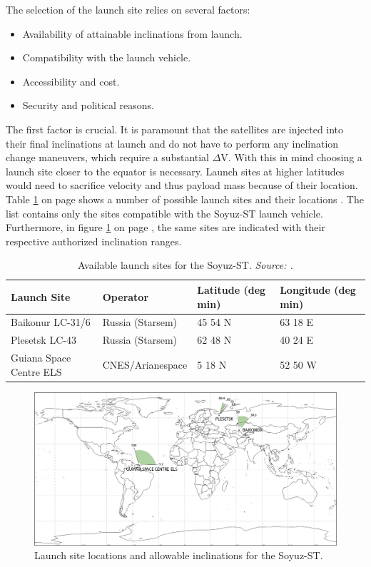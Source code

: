 The selection of the launch site relies on several factors:

\begin{itemize}
	\item Availability of attainable inclinations from launch.
	\item Compatibility with the launch vehicle.
	\item Accessibility and cost.
	\item Security and political reasons. 
\end{itemize}

The first factor is crucial. It is paramount that the satellites are injected into their final inclinations at launch and do not have to perform any inclination change maneuvers, which require a substantial $\Delta$V. With this in mind choosing a launch site closer to the equator is necessary. Launch sites at higher latitudes would need to sacrifice velocity and thus payload mass because of their location. Table \ref{table:launchtable} on page \pageref{table:launchtable} shows a number of possible launch sites and their locations \cite{larson}. The list contains only the sites compatible with the Soyuz-ST launch vehicle. Furthermore, in figure \ref{fig:launchsites} on page \pageref{fig:launchsites}, the same sites are indicated with their respective authorized inclination ranges.

\begin{table}[!h]
\begin{centering}
\begin{tabular}{llp{2cm}p{2cm}}
\toprule
Launch Site & Operator & Latitude (deg min) & Longitude (deg min) \\
\midrule
Baikonur LC-31/6  & Russia (Starsem) & 45 54 N & 63 18 E \\
Plesetsk LC-43  & Russia (Starsem)   &  62 48 N & 40 24 E \\
Guiana Space Centre  ELS  & CNES/Arianespace  & 5 18 N & 52 50 W \\
\bottomrule
\end{tabular}
\caption{Available launch sites for the Soyuz-ST.   \emph{Source: \cite{larson}.}}
\label{table:launchtable}
\end{centering}
\end{table}  

\begin{figure}[!h]
\centering
\includegraphics[width=1.0\textwidth, angle=0]{chapters/img/launchsites.png}
\caption{Launch site locations and allowable inclinations for the Soyuz-ST.}
\label{fig:launchsites}
\end{figure}

